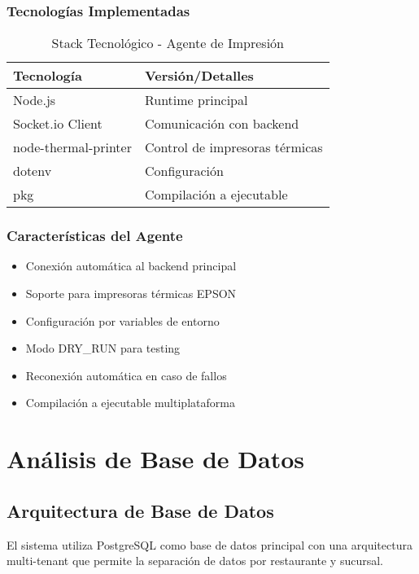\documentclass[12pt,a4paper]{article}
\begin{document}
\subsubsection{Tecnologías Implementadas}
\begin{table}[H]
\centering
\begin{tabular}{@{}ll@{}}
\toprule
\textbf{Tecnología} & \textbf{Versión/Detalles} \\
\midrule
Node.js & Runtime principal \\
Socket.io Client & Comunicación con backend \\
node-thermal-printer & Control de impresoras térmicas \\
dotenv & Configuración \\
pkg & Compilación a ejecutable \\
\bottomrule
\end{tabular}
\caption{Stack Tecnológico - Agente de Impresión}
\end{table}

\subsubsection{Características del Agente}
\begin{itemize}
    \item Conexión automática al backend principal
    \item Soporte para impresoras térmicas EPSON
    \item Configuración por variables de entorno
    \item Modo DRY\_RUN para testing
    \item Reconexión automática en caso de fallos
    \item Compilación a ejecutable multiplataforma
\end{itemize}

\section{Análisis de Base de Datos}

\subsection{Arquitectura de Base de Datos}

El sistema utiliza PostgreSQL como base de datos principal con una arquitectura multi-tenant que permite la separación de datos por restaurante y sucursal.
\end{document}
